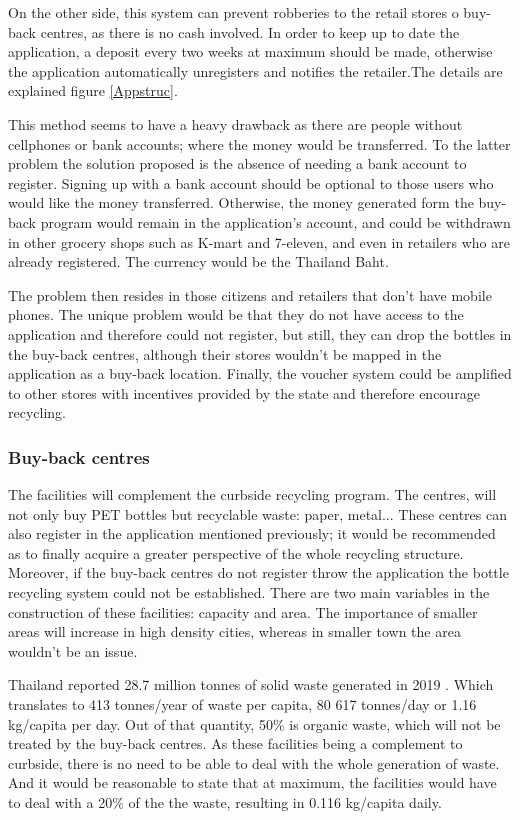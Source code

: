 \documentclass[twoside,a4paper,12pt]{report}
\begin{document}
On the other side, this system can prevent robberies to the retail stores o buy-back centres, as there is no cash involved. In order to keep up to date the application, a deposit every two weeks at maximum should be made, otherwise the application automatically unregisters and notifies the retailer.The details are explained figure \ref{Appstruc}.

This method seems to have a heavy drawback as there are people without cellphones or bank accounts; where the money would be transferred. To the latter problem the solution proposed is the absence of needing a bank account to register. Signing up with a bank account should be optional to those users who would like the money transferred. Otherwise, the money generated form the buy-back program would remain in the application's account, and could be withdrawn in other grocery shops such as K-mart and 7-eleven, and even in retailers who are already registered. The currency would be the Thailand Baht.

The problem then resides in those citizens and retailers that don't have mobile phones. The unique problem would be that they do not have access to the application and therefore could not register, but still, they can drop the bottles in the buy-back centres, although their stores wouldn't be mapped in the application as a buy-back location. Finally, the voucher system could be amplified to other stores with incentives provided by the state and therefore encourage recycling.



\subsubsection{Buy-back centres}
The facilities will complement the curbside recycling program. The centres, will not only buy PET bottles but recyclable waste: paper, metal... These centres can also register in the application mentioned previously; it would be recommended as to finally acquire a greater perspective of the whole recycling structure. Moreover, if the buy-back centres do not register throw the application the bottle recycling system could not be established. There are two main variables in the construction of these facilities: capacity and area. The importance of smaller areas will increase in high density cities, whereas in smaller town the area wouldn't be an issue. 

Thailand reported 28.7 million tonnes of solid waste generated in 2019 \cite{PCDpolstate2019}. Which translates to 413 tonnes/year of waste per capita, 80 617 tonnes/day or 1.16 kg/capita per day. Out of that quantity, 50\% is organic waste, which will not be treated by the buy-back centres. As these facilities being a complement to curbside, there is no need to be able to deal with the whole generation of waste. And it would be reasonable to state that at maximum, the facilities would have to deal with a 20\% of the the waste, resulting in 0.116 kg/capita daily.
\end{document}
